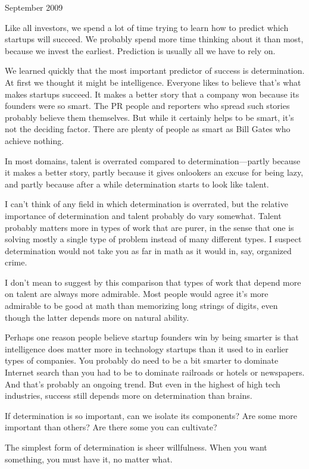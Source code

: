 September 2009

Like all investors, we spend a lot of time trying to learn how to
predict which startups will succeed. We probably spend more time
thinking about it than most, because we invest the earliest. Prediction
is usually all we have to rely on.

We learned quickly that the most important predictor of success is
determination. At first we thought it might be intelligence. Everyone
likes to believe that's what makes startups succeed. It makes a better
story that a company won because its founders were so smart. The PR
people and reporters who spread such stories probably believe them
themselves. But while it certainly helps to be smart, it's not the
deciding factor. There are plenty of people as smart as Bill Gates who
achieve nothing.

In most domains, talent is overrated compared to determination---partly
because it makes a better story, partly because it gives onlookers an
excuse for being lazy, and partly because after a while determination
starts to look like talent.

I can't think of any field in which determination is overrated, but the
relative importance of determination and talent probably do vary
somewhat. Talent probably matters more in types of work that are purer,
in the sense that one is solving mostly a single type of problem instead
of many different types. I suspect determination would not take you as
far in math as it would in, say, organized crime.

I don't mean to suggest by this comparison that types of work that
depend more on talent are always more admirable. Most people would agree
it's more admirable to be good at math than memorizing long strings of
digits, even though the latter depends more on natural ability.

Perhaps one reason people believe startup founders win by being smarter
is that intelligence does matter more in technology startups than it
used to in earlier types of companies. You probably do need to be a bit
smarter to dominate Internet search than you had to be to dominate
railroads or hotels or newspapers. And that's probably an ongoing trend.
But even in the highest of high tech industries, success still depends
more on determination than brains.

If determination is so important, can we isolate its components? Are
some more important than others? Are there some you can cultivate?

The simplest form of determination is sheer willfulness. When you want
something, you must have it, no matter what.

